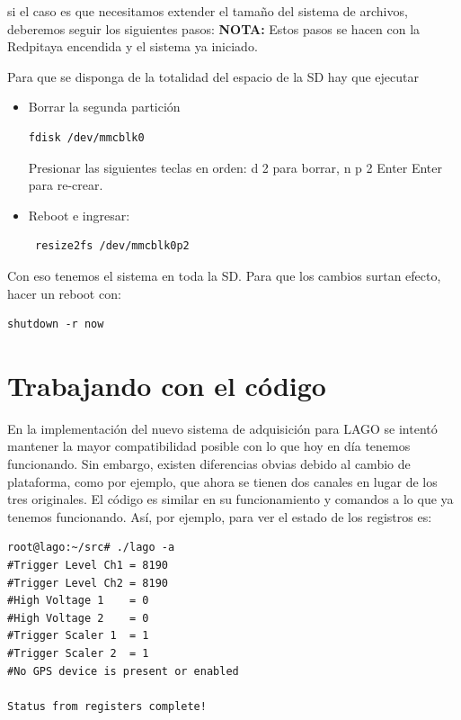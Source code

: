 \documentclass[a4paper,11pt]{article}
\begin{document}
\noindent si el caso es que necesitamos extender el tamaño del sistema de
archivos, deberemos seguir los siguientes pasos: 
\textbf{NOTA:} Estos pasos se hacen con la Redpitaya encendida y el sistema ya
iniciado.

\noindent Para que se disponga de la totalidad del espacio de la SD hay que ejecutar
\begin{itemize}
\item Borrar la segunda partición
\begin{verbatim}
fdisk /dev/mmcblk0
\end{verbatim}
Presionar las siguientes teclas en orden:
d 2 para borrar,
n p 2 Enter Enter para re-crear.

\item Reboot e ingresar:
\begin{verbatim}
 resize2fs /dev/mmcblk0p2
\end{verbatim}

\end{itemize}

\noindent Con eso tenemos el sistema en toda la SD. Para que los cambios surtan
efecto, hacer un reboot con: 
\begin{verbatim}
shutdown -r now
\end{verbatim}

\section{Trabajando con el código}

En la implementación del nuevo sistema de adquisición para LAGO se intentó
mantener la mayor compatibilidad posible con lo que hoy en día tenemos
funcionando. Sin embargo, existen diferencias obvias debido al cambio de
plataforma, como por ejemplo, que ahora se tienen dos canales en
lugar de los tres originales. El código es similar en su
funcionamiento y comandos a lo que ya tenemos funcionando. Así, por
ejemplo, para ver el estado de los registros es:

\begin{verbatim}
root@lago:~/src# ./lago -a
#Trigger Level Ch1 = 8190
#Trigger Level Ch2 = 8190
#High Voltage 1    = 0 
#High Voltage 2    = 0
#Trigger Scaler 1  = 1
#Trigger Scaler 2  = 1
#No GPS device is present or enabled

Status from registers complete!
\end{verbatim}
\end{document}
